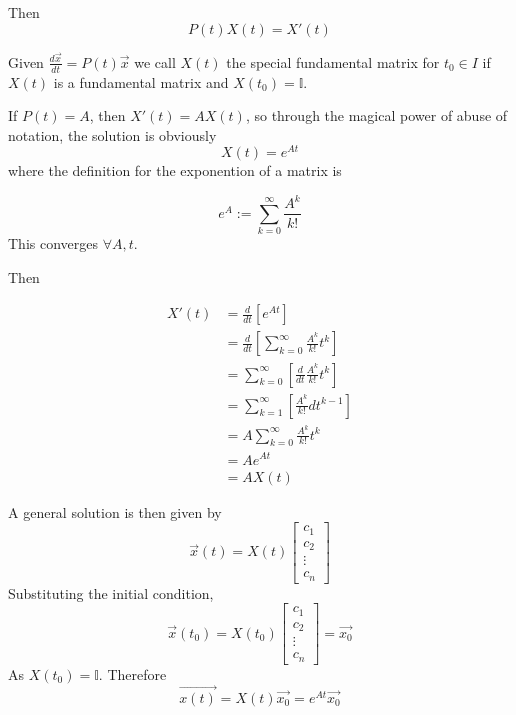 \documentclass[12pt]{article}
\begin{document}
Then
$$P(t)X(t) = X'(t)$$

\begin{defn}
	Given $\frac{d\vec{x}}{dt} = P(t)\vec{x}$ we call $X(t)$ the special fundamental matrix for $t_0\in I$ if $X(t)$ is a fundamental matrix and $X(t_0) = \mathbb{I}$.
\end{defn}

If $P(t) = A$, then $X'(t) = AX(t)$, so through the magical power of abuse of notation, the solution is obviously
$$X(t) = e^{At}$$
where the definition for the exponention of a matrix is

\begin{defn}
	$$e^A := \sum_{k=0}^\infty \frac{A^k}{k!}$$
	This converges $\forall A, t$.
\end{defn}

Then

\begin{align*}
	X'(t) &= \frac{d}{dt}\left[e^{At}\right] \\
	      &= \frac{d}{dt} \left[\sum_{k=0}^\infty \frac{A^k}{k!}t^k\right] \\
	      &= \sum_{k=0}^\infty\left[\frac{d}{dt} \frac{A^k}{k!}t^k\right] \\
	      &= \sum_{k=1}^\infty\left[\frac{A^k}{k!}dt^{k-1}\right] \\
	      &= A\sum_{k=0}^\infty \frac{A^k}{k!}t^k \\
	      &= Ae^{At} \\
	      &= AX(t)
\end{align*}

A general solution is then given by
$$\vec{x}(t) = X(t)\begin{bmatrix} c_1 \\ c_2 \\ \vdots \\ c_n\end{bmatrix}$$
Substituting the initial condition,
$$\vec{x}(t_0) = X(t_0)\begin{bmatrix} c_1 \\ c_2 \\ \vdots \\ c_n\end{bmatrix} = \vec{x_0}$$
As $X(t_0) = \mathbb{I}$. Therefore
$$\vec{x(t)} = X(t)\vec{x_0} = e^{At}\vec{x_0}$$
\end{document}
